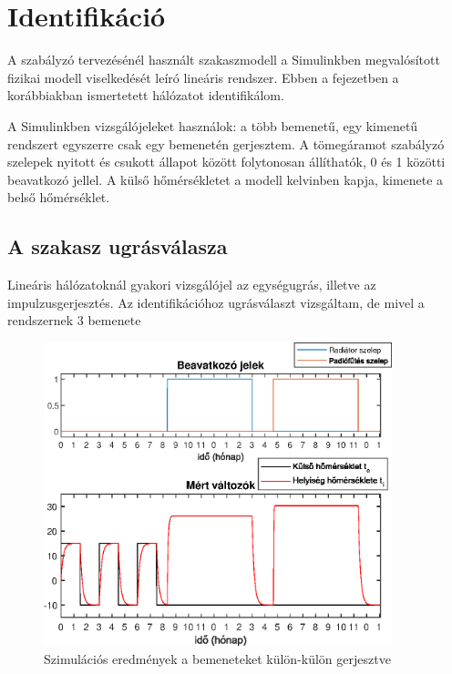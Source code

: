 \chapter{Identifikáció}\label{chap:ident}


A szabályzó tervezésénél használt szakaszmodell a Simulinkben megvalósított fizikai modell viselkedését leíró lineáris rendszer. Ebben a fejezetben a korábbiakban ismertetett hálózatot identifikálom.



A Simulinkben vizsgálójeleket használok: a több bemenetű, egy kimenetű rendszert egyszerre csak egy bemenetén gerjesztem. A tömegáramot szabályzó szelepek nyitott és csukott állapot között folytonosan állíthatók, 0 és 1 közötti beavatkozó jellel. A külső hőmérsékletet a modell kelvinben kapja, kimenete a belső hőmérséklet. 


\section{A szakasz ugrásválasza}

Lineáris hálózatoknál gyakori vizsgálójel az egységugrás, illetve az impulzusgerjesztés. Az identifikációhoz ugrásválaszt vizsgáltam, de mivel a rendszernek 3 bemenete 

\begin{figure}[H]
	\centering
	\includegraphics[trim=0 0 0 0, clip,width=0.9\textwidth]{figures/valve-step}
	\caption{Szimulációs eredmények a bemeneteket külön-külön gerjesztve}
	\label{fig:valve-step}
\end{figure}

